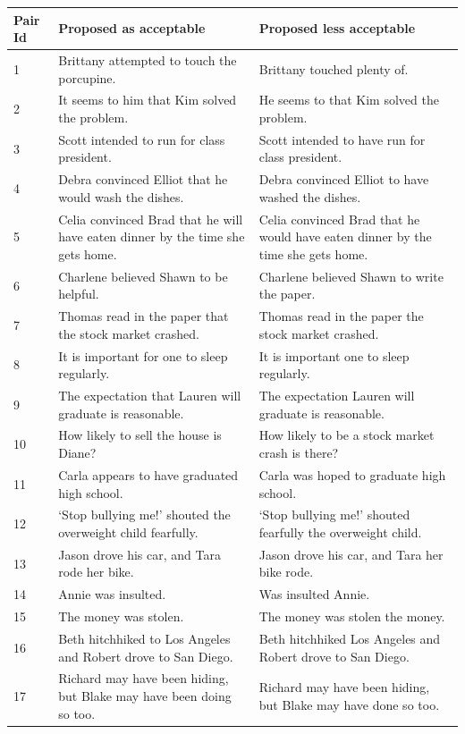 \documentclass[doc]{apa6}
\begin{document}
\begin{small}
\setlength\LTleft{-1in}
\setlength\LTright{-1in}
\begin{longtable}{p{1cm} | p{8.5cm} | p{8.5cm}}
Pair Id & Proposed as acceptable & Proposed less acceptable \\
\hline
1 & Brittany attempted to touch the porcupine. & Brittany touched plenty of. \\
2 & It seems to him that Kim solved the problem. & He seems to that Kim solved the problem.\\
3 & Scott intended to run for class president. & Scott intended to have run for class president.\\
4 & Debra convinced Elliot that he would wash the dishes. & Debra convinced Elliot to have washed the dishes.\\
5 & Celia convinced Brad that he will have eaten dinner by the time she gets home. & Celia convinced Brad that he would have eaten dinner by the time she gets home.\\
6 & Charlene believed Shawn to be helpful. & Charlene believed Shawn to write the paper.\\
7 & Thomas read in the paper that the stock market crashed. & Thomas read in the paper the stock market crashed.\\
8 & It is important for one to sleep regularly.  & It is important one to sleep regularly. \\
9 & The expectation that Lauren will graduate is reasonable. & The expectation Lauren will graduate is reasonable.\\
10 & How likely to sell the house is Diane? & How likely to be a stock market crash is there?\\
11 & Carla appears to have graduated high school. & Carla was hoped to graduate high school.\\
12 & `Stop bullying me!' shouted the overweight child fearfully. & `Stop bullying me!' shouted fearfully the overweight child.\\
13 & Jason drove his car, and Tara rode her bike. & Jason drove his car, and Tara her bike rode.\\
14 & Annie was insulted. & Was insulted Annie.\\
15 & The money was stolen. & The money was stolen the money.\\
16 & Beth hitchhiked to Los Angeles and Robert drove to San Diego. & Beth hitchhiked Los Angeles and Robert drove to San Diego.\\
17 & Richard may have been hiding, but Blake may have been doing so too. & Richard may have been hiding, but Blake may have done so too.\\

\end{longtable}
\end{small}
\end{document}
